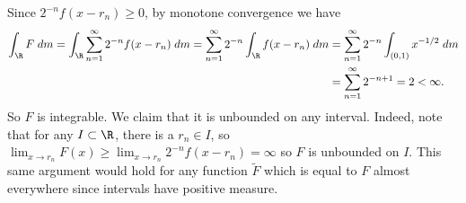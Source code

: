 \documentclass[11pt,letterpaper]{article}
\begin{document}
\begin{solution}
    Since $2^{-n}f(x-r_n)\geq 0$, by monotone convergence we have
    \[
        \begin{aligned}
            \int_\R F\;dm=\int_\R \sum^\infty_{n=1}2^{-n}f(x-r_n)\; dm=\sum^\infty_{n=1}2^{-n}\int_{\R} f(x-r_n)\; dm &=\sum^\infty_{n=1}2^{-n}\int_{(0,1)} x^{-1 /2}\;dm\\
            &=\sum^\infty_{n=1}2^{-n+1}=2<\infty.
        \end{aligned}
    \] 
    So $F$ is integrable. We claim that it is unbounded on any interval. Indeed, note that for any $I\subset \R$, there is a $r_n\in I$, so $\lim_{x\to r_n} F(x)\geq \lim_{x\to r_n}2^{-n}f(x-r_n)=\infty$ so $F$ is unbounded on $I$. This same argument would hold for any function $\widetilde{F}$ which is equal to $F$ almost everywhere since intervals have positive measure.
\end{solution}
\end{document}
